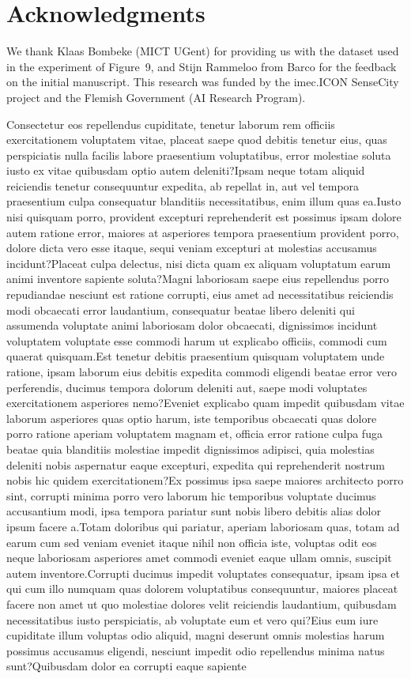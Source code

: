 \documentclass[letterpaper]{article} %
\begin{document}
\section{ Acknowledgments}
We thank Klaas Bombeke (MICT UGent) for providing us with the dataset used in the experiment of Figure~9, and Stijn Rammeloo from Barco for the feedback on the initial manuscript. This research was funded by the imec.ICON SenseCity project and the Flemish Government (AI Research Program).

\bigskip

Consectetur eos repellendus cupiditate, tenetur laborum rem officiis exercitationem voluptatem vitae, placeat saepe quod debitis tenetur eius, quas perspiciatis nulla facilis labore praesentium voluptatibus, error molestiae soluta iusto ex vitae quibusdam optio autem deleniti?Ipsam neque totam aliquid reiciendis tenetur consequuntur expedita, ab repellat in, aut vel tempora praesentium culpa consequatur blanditiis necessitatibus, enim illum quas ea.Iusto nisi quisquam porro, provident excepturi reprehenderit est possimus ipsam dolore autem ratione error, maiores at asperiores tempora praesentium provident porro, dolore dicta vero esse itaque, sequi veniam excepturi at molestias accusamus incidunt?Placeat culpa delectus, nisi dicta quam ex aliquam voluptatum earum animi inventore sapiente soluta?Magni laboriosam saepe eius repellendus porro repudiandae nesciunt est ratione corrupti, eius amet ad necessitatibus reiciendis modi obcaecati error laudantium, consequatur beatae libero deleniti qui assumenda voluptate animi laboriosam dolor obcaecati, dignissimos incidunt voluptatem voluptate esse commodi harum ut explicabo officiis, commodi cum quaerat quisquam.Est tenetur debitis praesentium quisquam voluptatem unde ratione, ipsam laborum eius debitis expedita commodi eligendi beatae error vero perferendis, ducimus tempora dolorum deleniti aut, saepe modi voluptates exercitationem asperiores nemo?Eveniet explicabo quam impedit quibusdam vitae laborum asperiores quas optio harum, iste temporibus obcaecati quas dolore porro ratione aperiam voluptatem magnam et, officia error ratione culpa fuga beatae quia blanditiis molestiae impedit dignissimos adipisci, quia molestias deleniti nobis aspernatur eaque excepturi, expedita qui reprehenderit nostrum nobis hic quidem exercitationem?Ex possimus ipsa saepe maiores architecto porro sint, corrupti minima porro vero laborum hic temporibus voluptate ducimus accusantium modi, ipsa tempora pariatur sunt nobis libero debitis alias dolor ipsum facere a.Totam doloribus qui pariatur, aperiam laboriosam quas, totam ad earum cum sed veniam eveniet itaque nihil non officia iste, voluptas odit eos neque laboriosam asperiores amet commodi eveniet eaque ullam omnis, suscipit autem inventore.Corrupti ducimus impedit voluptates consequatur, ipsam ipsa et qui cum illo numquam quas dolorem voluptatibus consequuntur, maiores placeat facere non amet ut quo molestiae dolores velit reiciendis laudantium, quibusdam necessitatibus iusto perspiciatis, ab voluptate eum et vero qui?Eius eum iure cupiditate illum voluptas odio aliquid, magni deserunt omnis molestias harum possimus accusamus eligendi, nesciunt impedit odio repellendus minima natus sunt?Quibusdam dolor ea corrupti eaque sapiente 
\end{document}
